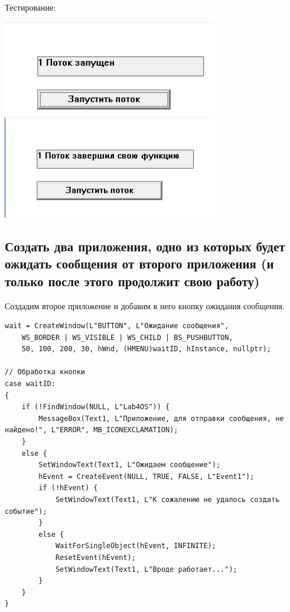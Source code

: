 \documentclass[12pt]{article}
\begin{document}
Тестирование:\\
\begin{center}
\includegraphics[width=0.7\textwidth]{assets/1.png}\\
\includegraphics[width=0.7\textwidth]{assets/2.png}\\    
\end{center}

\subsection{Создать два приложения, одно из которых будет ожидать сообщения от второго приложения (и только после этого продолжит свою работу)}

Создадим второе приложение и добавим в него кнопку ожидания сообщения.\\
\begin{verbatim}
wait = CreateWindow(L"BUTTON", L"Ожидание сообщения", 
    WS_BORDER | WS_VISIBLE | WS_CHILD | BS_PUSHBUTTON, 
    50, 100, 200, 30, hWnd, (HMENU)waitID, hInstance, nullptr);

// Обработка кнопки
case waitID:
{
    if (!FindWindow(NULL, L"Lab4OS")) {
        MessageBox(Text1, L"Приложение, для отправки сообщения, не найдено!", L"ERROR", MB_ICONEXCLAMATION);
    }
    else {
        SetWindowText(Text1, L"Ожидаем сообщение");
        hEvent = CreateEvent(NULL, TRUE, FALSE, L"Event1");
        if (!hEvent) {
            SetWindowText(Text1, L"К сожалению не удалось создать событие");
        }
        else {
            WaitForSingleObject(hEvent, INFINITE);
            ResetEvent(hEvent);
            SetWindowText(Text1, L"Вроде работает...");
        }
    }
}
\end{verbatim}
\end{document}
